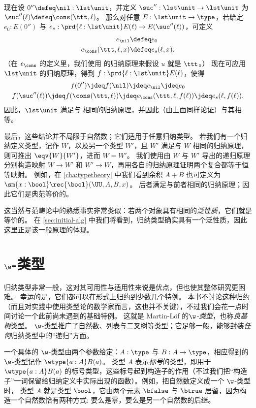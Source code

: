 现在设 $0'' \defeq \nil: \lst\unit$，并定义 $\suc'':\lst\unit\to\lst\unit$ 为 $\suc''(\ell) \defeq \cons(\ttt,\ell)$。
那么对任意 $E:\lst\unit\to\type$，若给定 $e_0:E(0'')$ 与 $e_s:\prd{\ell:\lst\unit} E(\ell) \to E(\suc''(\ell))$，可定义
\begin{align*}
  e_\nil &\defeq e_0\\
  e_\cons(\ttt,\ell,x) &\defeq e_s(\ell,x).
\end{align*}
（在 $e_\cons$ 的定义里，我们使用 \unit 的归纳原理来假设 $u$ 就是 $\ttt$。）
现在可应用 $\lst\unit$ 的归纳原理，得到 $f:\prd{\ell:\lst\unit} E(\ell)$，使得
\begin{gather*}
  f(0'') \jdeq f(\nil) \jdeq e_\nil \jdeq e_0\\
  f(\suc''(\ell)) \jdeq f(\cons(\ttt,\ell)) \jdeq e_\cons(\ttt,\ell,f(\ell)) \jdeq e_s(\ell,f(\ell)).
\end{gather*}
因此，$\lst\unit$ 满足与 \nat 相同的归纳原理，并因此（由上面同样论证）与其相等。

最后，这些结论并不局限于自然数；它们适用于任意归纳类型。
若我们有一个归纳定义类型，记作 $W$，以及另一个类型 $W'$，且 $W'$ 满足与 $W$ 相同的归纳原理，则可推出 $\eqv{W}{W'}$，进而 $W=W'$。
我们使用由 $W$ 与 $W'$ 导出的递归原理分别构造映射 $W\to W'$ 和 $W'\to W$，再用各自的归纳原理证明两个复合都等于恒等映射。
例如，在 \cref{cha:typetheory} 中我们看到余积 $A+B$ 也可定义为 $\sm{x:\bool} \rec{\bool}(\UU,A,B,x)$。
后者满足与前者相同的归纳原理；因此它们是典范等价的。

这当然与范畴论中的熟悉事实非常类似：若两个对象具有相同的\emph{泛性质}，它们就是等价的。
在 \cref{sec:initial-alg} 中我们将看到，归纳类型确实具有一个泛性质，因此这里正是该一般原理的体现。
\section{\texorpdfstring{$\w$}{W}-类型}
\label{sec:w-types}

归纳类型非常一般，这对其可用性与适用性来说是优点，但也使其整体研究更困难。
幸运的是，它们都可以在形式上归约到少数几个特例。
本书不讨论这种归约（而且对实践中使用类型论的数学家而言，这也并不关键），不过我们会花一点时间讨论一个此前尚未遇到的基础特例。
这就是 Martin-L{\"o}f 的\emph{$\w$-类型}，也称\emph{良基树}类型。
%
$\w$-类型推广了自然数、列表与二叉树等类型；它足够一般，能够封装\emph{任何}归纳类型中的“递归”方面。

一个具体的 $\w$-类型由两个参数给定：$A : \type$ 与 $B : A \to \type$，相应得到的 $\w$-类型记作 $\wtype{a:A} B(a)$。
类型 $A$ 表示\emph{标号}的类型，即用于 $\wtype{a :A} B(a)$ 的标号类型，这些标号起到构造子的作用（不过我们把“构造子”一词保留给归纳定义中实际出现的函数）。例如，把自然数定义成一个 $\w$-类型时，%
类型 $A$ 就是类型 $\bool$，它由两个元素 $\bfalse$ 与 $\btrue$ 居留，因为构造一个自然数恰有两种方式: 要么是零，要么是另一个自然数的后继。

